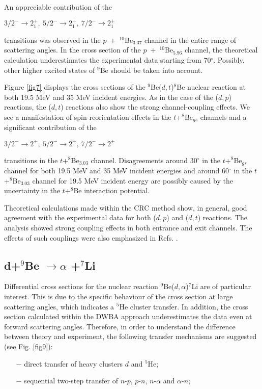 \documentclass[
12pt, %
oneside, %
english, %
onehalfspacing, %
headsepline, %
]{MastersDoctoralThesis} %
\begin{document}
An appreciable contribution of the \begin{small}
$3/2^- \rightarrow 2^+_1,~5/2^- \rightarrow 2^+_1,~7/2^-\rightarrow 2^+_1$
\end{small} transitions was observed in the $p$~+~$^{10}$Be$_{3.37}$ channel in the entire range of scattering angles. 
In the cross section of the  $p$~+~$^{10}$Be$_{5.96}$ channel, the theoretical calculation underestimates the experimental data starting from 70$^\circ$. Possibly, other higher excited states of $^9$Be should be taken into account.

Figure \ref{fig7} displays the cross sections of the ${}^9$Be($d,t$)${}^{8}$Be nuclear reaction at both 19.5 MeV and 35 MeV incident energies. As in the case of the ($d,p$) reactions, the ($d,t$) reactions also show the strong channel-coupling effects. We see a manifestation of spin-reorientation effects in the $t$+$^8$Be$_{gs}$ channels and a significant contribution of the  \begin{small}
$3/2^- \rightarrow 2^+,~ 5/2^- \rightarrow 2^+,~ 7/2^-\rightarrow 2^+$
\end{small} transitions in the $t$+$^8$Be$_{3.03}$ channel.
Disagreements around 30$^\circ$ in the $t$+$^8$Be$_{gs}$ channel for both 19.5 MeV and 35 MeV incident energies and around 60$^\circ$ in the $t$+$^8$Be$_{3.03}$ channel for 19.5 MeV incident energy are possibly caused by the uncertainty in the $t$+$^8$Be interaction potential.

Theoretical calculations made within the CRC method show, in general, good agreement with the experimental data for both ($d,p$)  and ($d,t$) reactions.
The analysis showed strong coupling effects in both entrance and exit channels. The effects of such couplings were also emphasized in Refs. \cite{harakeh1980, rudchik2016}.


\subsection{d+$^9$Be $\rightarrow \alpha$ +$^{7}$Li}

Differential cross sections for the nuclear reaction ${^9}$Be($d,\alpha$)${}^7$Li are of particular interest. This is due to the specific behaviour of the cross section at large scattering angles, which indicates a ${}^5$He cluster transfer. In addition, the cross section calculated within the DWBA approach underestimates the data even at forward scattering angles. Therefore, in order to understand the difference between theory and experiment, the following transfer mechanisms are suggested (see Fig. \ref{fig9}):
\begin{itemize}
\item[$-$] direct transfer of heavy clusters $d$ and ${}^5$He;
\item[$-$] sequential two-step transfer of $n$-$p$, $p$-$n$, $n$-$\alpha$ and $\alpha$-$n$;
\end{itemize}
\end{document}

